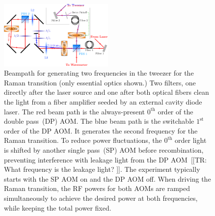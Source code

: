 \documentclass[aps,prl,twocolumn,10pt,superscriptaddress]{revtex4-1}
\begin{document}
\begin{figure}
  \includegraphics[width=0.5\textwidth]{imgs/raman_spectroscopy_raman_beampath.pdf}
  \caption{
    Beampath for generating two frequencies in the tweezer for the Raman transition (only essential optics shown.)
    Two  filters, one directly after the laser source and one after both optical fibers clean the light from a fiber amplifier seeded by an external cavity diode laser.
    The red beam path is the always-present $0^\mathrm{th}$ order of the double pass~(DP) AOM.
    The blue beam path is the switchable $1^\mathrm{st}$ order of the DP AOM. It generates the second frequency for the Raman transition.
    To reduce power fluctuations, the $0^\mathrm{th}$ order light is shifted by another single pass~(SP) AOM before recombination, preventing interference with leakage light from the DP AOM~[[TR: What frequency is the leakage light? ]].
    The experiment typically starts with the SP AOM on and the DP AOM off.
    When driving the Raman transition, the RF powers for both AOMs are ramped simultaneously
    to achieve the desired power at both frequencies, while keeping the total power fixed.
    \label{f-beampath}
  }
\end{figure}
\end{document}
